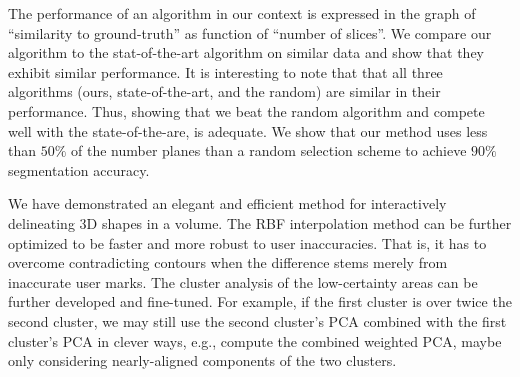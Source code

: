 The performance of an algorithm in our context is expressed in the graph of ``similarity to ground-truth'' as function of ``number of slices''. 
We compare our algorithm to the stat-of-the-art algorithm on similar data and show that they exhibit similar performance.
It is interesting to note that that all three algorithms (ours, state-of-the-art, and the random) are similar in their performance.
Thus, showing that we beat the random algorithm and compete well with the state-of-the-are, is adequate.
We show that our method uses less than $50\%$ of the number planes than a random selection scheme to achieve $90\%$ segmentation accuracy.

We have demonstrated an elegant and efficient method for interactively delineating 3D shapes in a volume.
The RBF interpolation method can be further optimized to be faster and more robust to user inaccuracies. That is, it has to overcome contradicting contours when the difference stems merely from inaccurate user marks.
The cluster analysis of the low-certainty areas can be further developed and fine-tuned. For example, if the first cluster is over twice the second cluster, we may still use the second cluster's PCA combined with the first cluster's PCA in clever ways, e.g., compute the combined weighted PCA, maybe only considering nearly-aligned components of the two clusters.


\hypersetup{pageanchor=true}

\iffalse
In this thesis we present a scheme to reduce the amount of user iterations required to segment an object by delineating on cross-section planes. Starting with an initial segmentation created from a small number of delineated curves, the algorithm progressively analyzes the uncertainty of segmentation with respect to the image features and suggests the ``next plane'' for delineation that would maximally resolve the uncertain regions. The problem of ``where to delineate next'' is an ill-posed geometric problem since the target shape cannot be defined without the expert know-how. Compared with the few prior art on this problem, we adopt a simpler computational framework that is made up of an RBF-based curve interpolation method, a distance-based uncertainty metric, and a plane determination approach using density-based clustering. We demonstrate using both synthetic and real examples that our method uses less than $50\%$ of the number planes than a random selection scheme to achieve $90\%$ segmentation accuracy.
\fi

